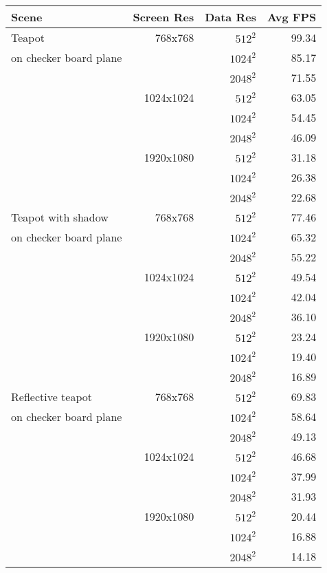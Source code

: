 \begin{tabular}{|l|r|r|r|}
\hline

Scene \hspace{200pt} & Screen Res & Data Res & Avg FPS \\
\hline

	\quad 1 \quad		Teapot							& 768x768		& $512^2 $	&	99.34	\\
		\cline{3-4}
	\quad \quad \quad	on checker board plane			& 				& $1024^2 $	&	85.17	\\
	\cline{3-4}
														&				& $2048^2 $ &	71.55	\\
		\cline{2-4}
														& 1024x1024		& $512^2 $	&	63.05	\\
		\cline{3-4}
														& 				& $1024^2 $	&	54.45	\\
	\cline{3-4}
														&				& $2048^2 $ &	46.09	\\
		\cline{2-4}
														& 1920x1080		& $512^2 $	&	31.18	\\
		\cline{3-4}
														& 				& $1024^2 $	&	26.38	\\
	\cline{3-4}
														&				& $2048^2 $ &	22.68	\\
\hline

	\quad 2 \quad		Teapot with shadow				& 768x768		& $512^2 $	&	77.46	\\
		\cline{3-4}
	\quad \quad \quad	on checker board plane			& 				& $1024^2 $	&	65.32	\\
	\cline{3-4}
														&				& $2048^2 $ &	55.22	\\
		\cline{2-4}
														& 1024x1024		& $512^2 $	&	49.54	\\
		\cline{3-4}
														& 				& $1024^2 $	&	42.04	\\
	\cline{3-4}
														&				& $2048^2 $ &	36.10	\\
		\cline{2-4}
														& 1920x1080		& $512^2 $	&	23.24	\\
		\cline{3-4}
														& 				& $1024^2 $	&	19.40	\\
	\cline{3-4}
														&				& $2048^2 $ &	16.89	\\
\hline

	\quad 3 \quad		Reflective teapot				& 768x768		& $512^2 $	&	69.83	\\
		\cline{3-4}
	\quad \quad \quad	on checker board plane			& 				& $1024^2 $	&	58.64	\\
	\cline{3-4}
														&				& $2048^2 $ &	49.13	\\
		\cline{2-4}
														& 1024x1024		& $512^2 $	&	46.68	\\
		\cline{3-4}
														& 				& $1024^2 $	&	37.99	\\
	\cline{3-4}
														&				& $2048^2 $ &	31.93	\\
		\cline{2-4}
														& 1920x1080		& $512^2 $	&	20.44	\\
		\cline{3-4}
														& 				& $1024^2 $	&	16.88	\\
	\cline{3-4}
														&				& $2048^2 $ &	14.18	\\
\hline


\end{tabular}
